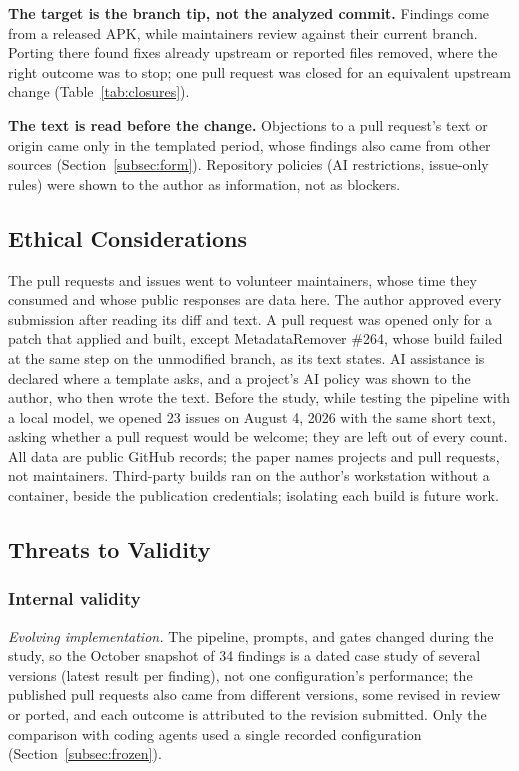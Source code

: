 \documentclass[conference]{IEEEtran}
\begin{document}
\textbf{The target is the branch tip, not the analyzed commit.} Findings come
from a released APK, while maintainers review against their current branch.
Porting there found fixes already upstream or reported files removed, where
the right outcome was to stop; one pull request was closed for an equivalent
upstream change (Table~\ref{tab:closures}).

\textbf{The text is read before the change.} Objections to a pull request's
text or origin came only in the templated period, whose findings also came from
other sources (Section~\ref{subsec:form}). Repository policies (AI
restrictions, issue-only rules) were shown to the author as information, not as
blockers.

\subsection{Ethical Considerations}
\label{subsec:ethics}

The pull requests and issues went to volunteer maintainers, whose time they
consumed and whose public responses are data here. The author approved every
submission after reading its diff and text. A pull request was opened only for
a patch that applied and built, except MetadataRemover \#264, whose build
failed at the same step on the unmodified branch, as its text states. AI assistance is declared where a
template asks, and a project's AI policy was shown to the author, who then
wrote the text. Before the study, while testing the pipeline with a local
model, we opened 23 issues on August 4, 2026 with the same short text, asking
whether a pull request would be welcome; they are left out of every count. All data are public GitHub records; the paper
names projects and pull requests, not maintainers. Third-party builds ran on
the author's workstation without a container, beside the publication
credentials; isolating each build is future work.

\subsection{Threats to Validity}
\label{subsec:threats}

\subsubsection{Internal validity}

\emph{Evolving implementation.} The pipeline, prompts, and gates changed during
the study, so the October snapshot of 34 findings is a dated case study of
several versions (latest result per finding), not one configuration's
performance; the published pull requests also came from different versions,
some revised in review or ported, and each outcome is attributed to the
revision submitted. Only the comparison with coding agents used a single
recorded configuration (Section~\ref{subsec:frozen}).
\end{document}
